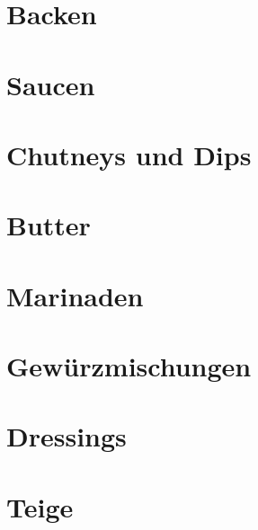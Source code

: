 \documentclass[DIV=11, pagesize, fontsize=11pt, paper=a4, numbers=noenddot]{scrartcl}
\begin{document}
\section{Backen}
\newpage{}
\newpage{}
\newpage{}

\section{Saucen}
\newpage{}
\newpage{}
\newpage{}
\newpage{}
\newpage{}
\newpage{}
\newpage{}
\newpage{}
\newpage{}
\newpage{}

\section{Chutneys und Dips}
\newpage{}
\newpage{}
\newpage{}
\newpage{}

\section{Butter}
\newpage{}
\newpage{}
\newpage{}
\newpage{}
\newpage{}

\section{Marinaden}
\newpage{}
\newpage{}
\newpage{}

\section{Gewürzmischungen}
\newpage{}

\section{Dressings}
\newpage{}

\section{Teige}
\newpage{}
\end{document}

